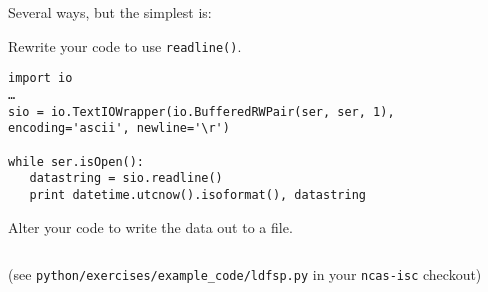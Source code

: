 \documentclass[a4paper,11pt]{article}
\begin{document}
\begin{solution}
Several ways, but the simplest is:

\noindent\usebox\serloop

\end{solution}

\begin{question}
Rewrite your code to use \texttt{readline()}.
\end{question}
\newsavebox\readlinebox
\begin{lrbox}{\readlinebox}
\begin{minipage}{\textwidth}
\begin{verbatim}
import io
…
sio = io.TextIOWrapper(io.BufferedRWPair(ser, ser, 1), encoding='ascii', newline='\r')

while ser.isOpen():
   datastring = sio.readline()
   print datetime.utcnow().isoformat(), datastring
\end{verbatim}
\end{minipage}
\end{lrbox}

\begin{solution}
\noindent\usebox\readlinebox
\end{solution}
\begin{question}
Alter your code to write the data out to a file.
\end{question}

\newsavebox\logfile
\begin{lrbox}{\logfile}
\begin{minipage}{\textwidth}
\inputminted[bgcolor=lightyellow]{python}{../../../python/exercises/example_code/ldfsp.py}
\end{minipage}
\end{lrbox}
\newpage
\begin{solution}
\noindent\usebox\logfile
\par
(see \texttt{python/exercises/example\_code/ldfsp.py} in your \texttt{ncas-isc} checkout)
\end{solution}
\newpage
\printsolutions
\newpage
\end{document}
